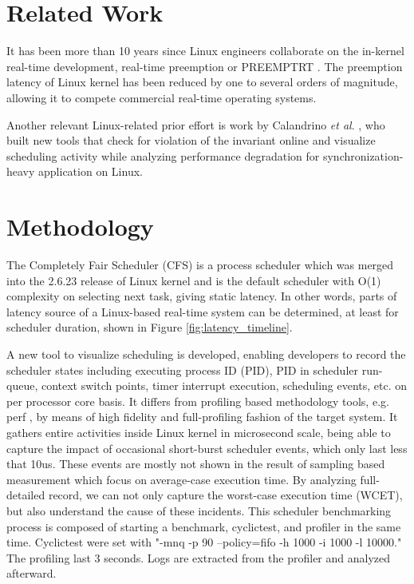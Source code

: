 \documentclass[conference]{IEEEtran}
\begin{document}
\section{Related Work}

It has been more than 10 years since Linux engineers collaborate on the in-kernel real-time development, real-time
preemption or PREEMPT\textunderscore RT \cite{rt-linux}. The preemption latency of Linux kernel has been reduced by
one to several orders of magnitude, allowing it to compete commercial real-time operating systems.

Another relevant Linux-related prior effort is work by Calandrino \textit{et al}. \cite{Lozi:2016:LSD:2901318.2901326},
who built new tools that check for violation of the invariant online and visualize scheduling activity while analyzing
performance degradation for synchronization-heavy application on Linux.

\section{Methodology}

    The Completely Fair Scheduler (CFS) is a process scheduler which was merged into the 2.6.23 release of Linux kernel
    and is the default scheduler with O(1) complexity on selecting next task, giving static latency. In other words, parts
    of latency source of a Linux-based real-time system can be determined, at least for scheduler duration, shown in
    Figure \ref{fig:latency_timeline}.

    A new tool to visualize scheduling is developed, enabling developers to record the scheduler states including
    executing process ID (PID), PID in scheduler run-queue, context switch points, timer interrupt execution, scheduling
    events, etc. on per processor core basis. It differs from profiling based methodology tools, e.g. perf \cite{perf},
    by means of high fidelity and full-profiling fashion of the target system. It gathers entire activities inside Linux
    kernel in microsecond scale, being able to capture the impact of occasional short-burst scheduler events, which only
    last less that 10us. These events are mostly not shown in the result of sampling based measurement which focus on
    average-case execution time. By analyzing full-detailed record, we can not only capture the worst-case execution
    time (WCET), but also understand the cause of these incidents. This scheduler benchmarking process is composed of
    starting a benchmark, cyclictest, and profiler in the same time. Cyclictest were set with "-mnq
    -p 90 --policy=fifo -h 1000 -i 1000 -l 10000." The profiling last 3 seconds. Logs are extracted from the profiler
    and analyzed afterward.
\end{document}
